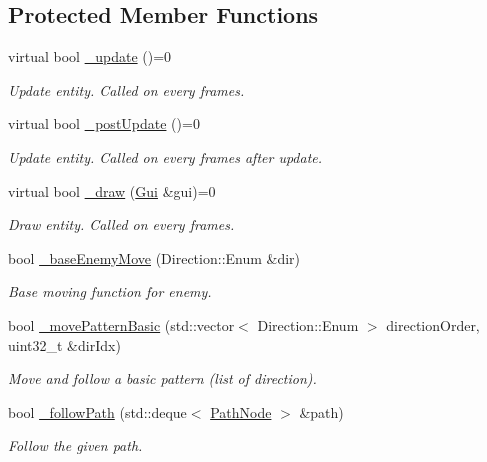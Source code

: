 \subsection*{Protected Member Functions}
\begin{DoxyCompactItemize}
\item 
virtual bool \hyperlink{class_a_enemy_abefc22131eb1c618819c67c3c1415c08}{\+\_\+update} ()=0
\begin{DoxyCompactList}\small\item\em Update entity. Called on every frames. \end{DoxyCompactList}\item 
virtual bool \hyperlink{class_a_enemy_a78b010638f552c4ab11ff71e7b826b1b}{\+\_\+post\+Update} ()=0
\begin{DoxyCompactList}\small\item\em Update entity. Called on every frames after update. \end{DoxyCompactList}\item 
virtual bool \hyperlink{class_a_enemy_a70e3638b5ed8ecea2a087ffe16510dd2}{\+\_\+draw} (\hyperlink{class_gui}{Gui} \&gui)=0
\begin{DoxyCompactList}\small\item\em Draw entity. Called on every frames. \end{DoxyCompactList}\item 
bool \hyperlink{class_a_enemy_aff49d7d4a833983ede184276ebf93b67}{\+\_\+base\+Enemy\+Move} (Direction\+::\+Enum \&dir)
\begin{DoxyCompactList}\small\item\em Base moving function for enemy. \end{DoxyCompactList}\item 
bool \hyperlink{class_a_enemy_a2ddbe01e55094dbbff085ff10b1db957}{\+\_\+move\+Pattern\+Basic} (std\+::vector$<$ Direction\+::\+Enum $>$ direction\+Order, uint32\+\_\+t \&dir\+Idx)
\begin{DoxyCompactList}\small\item\em Move and follow a basic pattern (list of direction). \end{DoxyCompactList}\item 
bool \hyperlink{class_a_enemy_ae9fafd83ac6040298120c6e3a8656743}{\+\_\+follow\+Path} (std\+::deque$<$ \hyperlink{struct_path_node}{Path\+Node} $>$ \&path)
\begin{DoxyCompactList}\small\item\em Follow the given path. \end{DoxyCompactList}\item 

\end{DoxyCompactItemize}
